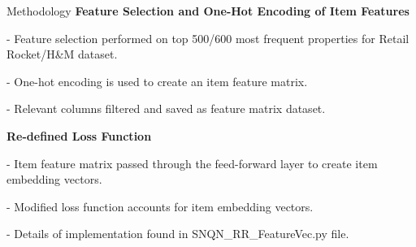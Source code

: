 \documentclass{beamer}
\begin{document}


\begin{frame}{Methodology}
\textbf{Feature Selection and One-Hot Encoding of Item Features}

- Feature selection performed on top 500/600 most frequent properties for Retail Rocket/H&M dataset.

- One-hot encoding is used to create an item feature matrix.

- Relevant columns filtered and saved as feature matrix dataset.

\textbf{Re-defined Loss Function}

- Item feature matrix passed through the feed-forward layer to create item embedding vectors.

- Modified loss function accounts for item embedding vectors.

- Details of implementation found in SNQN_RR_FeatureVec.py file.

\end{frame}
\end{document}
